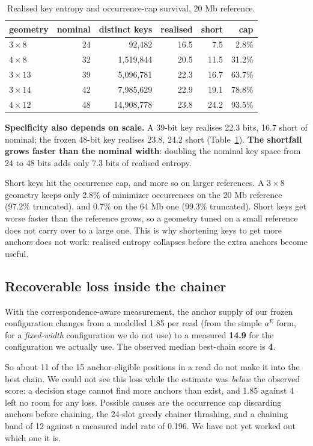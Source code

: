 \documentclass[conference]{IEEEtran}
\begin{document}
\begin{table}[t]
\caption{Realised key entropy and occurrence-cap survival, 20 Mb reference.}
\label{tab:entropy}
\centering
\scriptsize
\begin{tabular}{lrrrrr}
\toprule
geometry & nominal & distinct keys & realised & short & cap \\
\midrule
$3 \times 8$  & 24 & 92,482     & 16.5 & 7.5  & 2.8\%  \\
$4 \times 8$  & 32 & 1,519,844  & 20.5 & 11.5 & 31.2\% \\
$3 \times 13$ & 39 & 5,096,781  & 22.3 & 16.7 & 63.7\% \\
$3 \times 14$ & 42 & 7,985,629  & 22.9 & 19.1 & 78.8\% \\
$4 \times 12$ & 48 & 14,908,778 & 23.8 & 24.2 & 93.5\% \\
\bottomrule
\end{tabular}
\end{table}

\textbf{Specificity also depends on scale.} A 39-bit key realises 22.3 bits, 16.7 short of
nominal; the frozen 48-bit key realises 23.8, 24.2 short (Table~\ref{tab:entropy}). \textbf{The
shortfall grows faster than the nominal width}: doubling the nominal key space from 24 to 48
bits adds only 7.3 bits of realised entropy.

Short keys hit the occurrence cap, and more so on larger references. A $3 \times 8$ geometry
keeps only 2.8\% of minimizer occurrences on the 20 Mb reference (97.2\% truncated), and 0.7\% on
the 64 Mb one (99.3\% truncated). Short keys get worse faster than the reference grows, so a
geometry tuned on a small reference does not carry over to a large one. This is why shortening
keys to get more anchors does not work: realised entropy collapses before the extra anchors
become useful.

\subsection{Recoverable loss inside the chainer}

With the correspondence-aware measurement, the anchor supply of our frozen configuration
changes from a modelled 1.85 per read (from the simple $a^{E}$ form, for a \emph{fixed-width}
configuration we do not use) to a measured \textbf{14.9} for the configuration we actually use.
The observed median best-chain score is \textbf{4}.

So about 11 of the 15 anchor-eligible positions in a read do not make it into the best chain. We
could not see this loss while the estimate was \emph{below} the observed score: a decision stage
cannot find more anchors than exist, and 1.85 against 4 left no room for any loss. Possible
causes are the occurrence cap discarding anchors before chaining, the 24-slot greedy chainer
thrashing, and a chaining band of 12 against a measured indel rate of 0.196. We have not yet
worked out which one it is.
\end{document}
